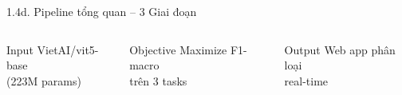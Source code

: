 \documentclass[11pt, aspectratio=169]{beamer}
\begin{document}
\begin{frame}[shrink=5]{1.4d. Pipeline tổng quan -- 3 Giai đoạn}
\vspace{0.3cm}
\begin{columns}[T]
  \begin{block}{\centering Input}
    \centering VietAI/vit5-base\\(223M params)
  \end{block}

  \begin{block}{\centering Objective}
    \centering Maximize F1-macro\\trên 3 tasks
  \end{block}

  \begin{block}{\centering Output}
    \centering Web app phân loại\\real-time
  \end{block}
\end{columns}
\end{frame}
\end{document}
